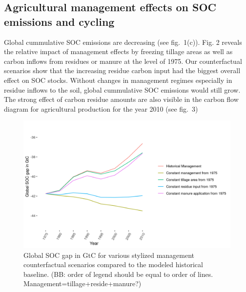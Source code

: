 \documentclass[gc, manuscript]{copernicus}
\begin{document}
\subsection{Agricultural management effects on SOC emissions and
cycling}

Global cummulative SOC emissions are decreasing (see fig.~1(c)). Fig. 2
reveals the relative impact of management effects by freezing tillage
areas as well as carbon inflows from residues or manure at the level of
1975. Our counterfactual scenarios show that the increasing residue
carbon input had the biggest overall effect on SOC stocks. Without
changes in management regimes especially in residue inflows to the soil,
global cummulative SOC emissions would still grow. The strong effect of
carbon residue amounts are also visible in the carbon flow diagram for
agricultural production for the year 2010 (see fig.~3)

\begin{figure}[H]
\includegraphics[width=18cm]{../ResultNotebooks/Output/Images/scenario} \caption{Global SOC gap in GtC for various stylized management counterfactual scenarios compared to the modeled historical baseline. (BB: order of legend should be equal to order of lines. Management=tillage+reside+manure?)}\label{fig:SOCscen}
\end{figure}
\end{document}
